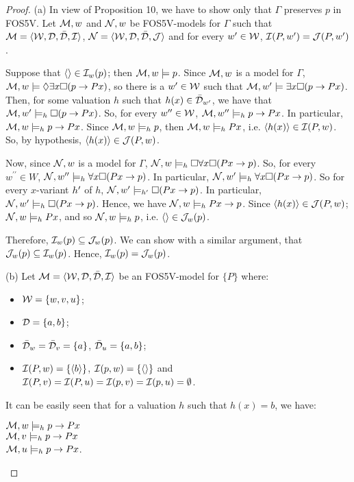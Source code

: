 \begin{proof}
(a) In view of Proposition 10, we have to show only that $\Gamma$ preserves $p$ in FOS5V. Let $\mathcal{M},w$ and $\mathcal{N},w$ be FOS5V-models for $\Gamma$ such that $\mathcal{M} = \langle \mathcal{W},\mathcal{D},\bar{\mathcal{D}},\mathcal{I} \rangle$, $\mathcal{N} = \langle \mathcal{W},\mathcal{D},\bar{\mathcal{D}},\mathcal{J} \rangle$ and for every $w^{\prime} \in \mathcal{W}$, $\mathcal{I}(P,w^{\prime}) = \mathcal{J}(P,w^{\prime})$. 

\qquad Suppose that $\langle \rangle \in \mathcal{I}_{w}(p)$; then $\mathcal{M},w \models p$. Since $\mathcal{M},w$ is a model for $\Gamma$, $\mathcal{M},w \models \Diamond \exists x \Box (p \rightarrow Px)$, so there is a $w^{\prime} \in \mathcal{W}$ such that $\mathcal{M},w^{\prime} \models \exists x \Box (p \rightarrow Px)$. Then, for some valuation $h$ such that $h(x) \in \bar{\mathcal{D}}_{w^{\prime}}$, we have that $\mathcal{M},w^{\prime} \models_{h} \Box (p \rightarrow Px)$. So, for every $w^{\prime\prime} \in \mathcal{W}$, $\mathcal{M},w^{\prime\prime} \models_{h} p \rightarrow Px$. In particular, $\mathcal{M},w \models_{h} p \rightarrow Px$. Since $\mathcal{M},w \models_{h} p$, then $\mathcal{M},w \models_{h} Px$, i.e. $\langle h(x) \rangle \in \mathcal{I}(P,w)$. So, by hypothesis, $\langle h(x) \rangle \in \mathcal{J}(P,w)$.

\qquad Now, since $\mathcal{N},w$ is a model for $\Gamma$, $\mathcal{N},w \models_{h} \Box \forall x \Box (Px \rightarrow p)$.  So, for every $w^{\prime\prime} \in W$, $\mathcal{N},w^{\prime\prime} \models_{h} \forall x \Box (Px \rightarrow p)$. In particular, $\mathcal{N},w^{\prime} \models_{h} \forall x \Box (Px \rightarrow p)$. So for every $x$-variant $h^{\prime}$ of $h$, $\mathcal{N},w^{\prime} \models_{h^{\prime}} \Box (Px \rightarrow p)$. In particular, $\mathcal{N},w^{\prime} \models_{h} \Box (Px \rightarrow p)$. Hence, we have $\mathcal{N},w \models_{h} Px \rightarrow p$. Since $\langle h(x) \rangle \in \mathcal{J}(P,w)$; $\mathcal{N},w \models_{h} Px$, and so $\mathcal{N},w \models_{h} p$, i.e. $\langle \rangle \in \mathcal{J}_{w}(p)$. 

\qquad Therefore, $\mathcal{I}_{w}(p) \subseteq \mathcal{J}_{w}(p)$. We can show with a similar argument, that $\mathcal{J}_{w}(p) \subseteq \mathcal{I}_{w}(p)$. Hence, $\mathcal{I}_{w}(p) = \mathcal{J}_{w}(p)$.   

\qquad (b) Let $\mathcal{M} = \langle\mathcal{W},\mathcal{D}, \bar{\mathcal{D}},\mathcal{I}\rangle$ be an FOS5V-model for $\{P\}$ where:
\begin{itemize}
\item $\mathcal{W} = \{w,v,u\}$;
\item $\mathcal{D} = \{a,b\}$;
\item $\bar{\mathcal{D}}_{w} = \bar{\mathcal{D}}_{v} = \{a\}$, $\bar{\mathcal{D}}_{u} =\{a,b\}$;
\item $\mathcal{I}(P,w) =\{\langle b \rangle \}$, $\mathcal{I}(p,w)=\{\langle \rangle\}$ and\\
$\mathcal{I}(P,v) = \mathcal{I}(P,u) = \mathcal{I}(p,v) = \mathcal{I}(p,u) = \emptyset$.
\end{itemize}

\qquad It can be easily seen that for a valuation $h$ such that $h(x) =b$, we have:
\begin{center}
$\mathcal{M},w \models_{h} p \rightarrow Px$\\
$\mathcal{M},v \models_{h} p \rightarrow Px$\\
$\mathcal{M},u \models_{h} p \rightarrow Px$.
\end{center}


\end{proof}
